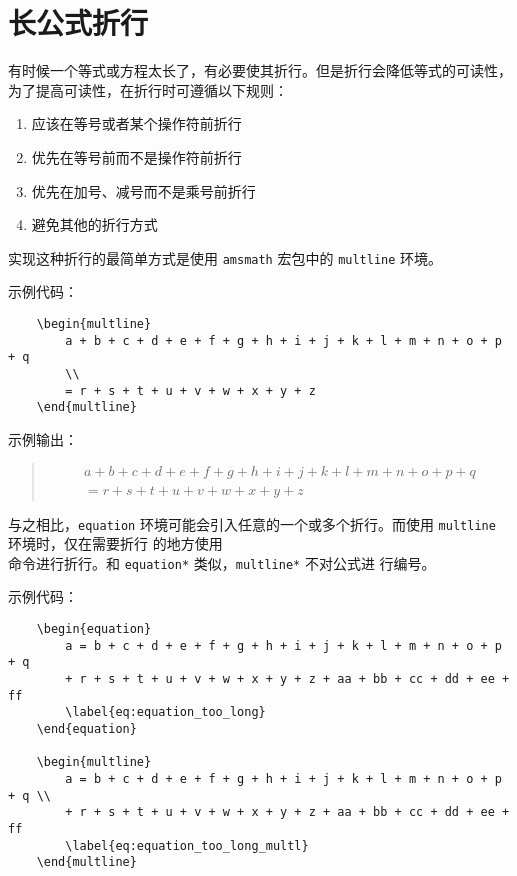 \documentclass[UTF8]{ctexart}
\begin{document}
\section{长公式折行}
有时候一个等式或方程太长了，有必要使其折行。但是折行会降低等式的可读性，为了提高可读性，在折行时可遵循以下规则：

\begin{enumerate}
    \item 应该在等号或者某个操作符前折行
    \item 优先在等号前而不是操作符前折行
    \item 优先在加号、减号而不是乘号前折行
    \item 避免其他的折行方式
\end{enumerate}

实现这种折行的最简单方式是使用 \texttt{amsmath} 宏包中的 \texttt{multline} 环境。

示例代码：
\begin{verbatim}
    \begin{multline}
        a + b + c + d + e + f + g + h + i + j + k + l + m + n + o + p + q
        \\
        = r + s + t + u + v + w + x + y + z
    \end{multline}
\end{verbatim}

示例输出：
\begin{quote}
    \begin{multline}
        a + b + c + d + e + f + g + h + i + j + k + l + m + n + o + p + q
        \\
        = r + s + t + u + v + w + x + y + z
    \end{multline}
\end{quote}

与之相比，\texttt{equation} 环境可能会引入任意的一个或多个折行。而使用 \texttt{multline} 环境时，仅在需要折行
的地方使用 \texttt{\\} 命令进行折行。和 \texttt{equation*} 类似，\texttt{multline*} 不对公式进
行编号。

示例代码：
\begin{verbatim}
    \begin{equation}
        a = b + c + d + e + f + g + h + i + j + k + l + m + n + o + p + q
        + r + s + t + u + v + w + x + y + z + aa + bb + cc + dd + ee + ff
        \label{eq:equation_too_long}
    \end{equation}

    \begin{multline}
        a = b + c + d + e + f + g + h + i + j + k + l + m + n + o + p + q \\
        + r + s + t + u + v + w + x + y + z + aa + bb + cc + dd + ee + ff
        \label{eq:equation_too_long_multl}
    \end{multline}
\end{verbatim}
\end{document}

